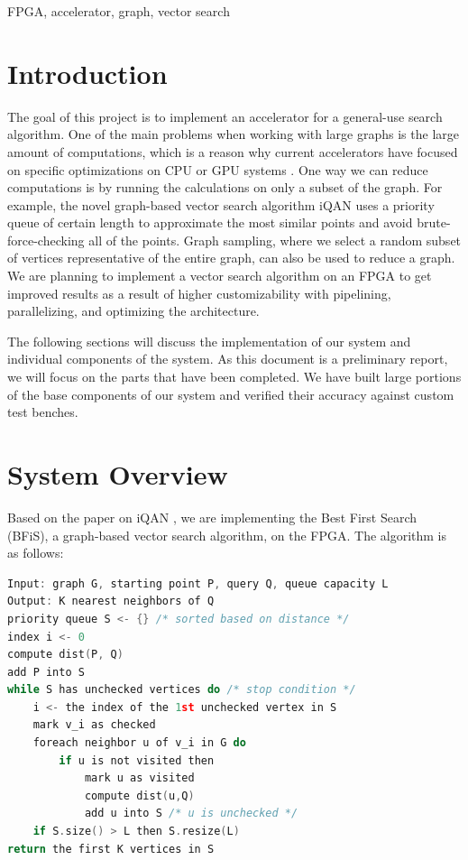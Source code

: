 \documentclass[conference]{IEEEtran}
\begin{document}
\begin{IEEEkeywords}
FPGA, accelerator, graph, vector search
\end{IEEEkeywords}

\section{Introduction}
The goal of this project is to implement an accelerator for a general-use search algorithm. One of the main problems when working with large graphs is the large amount of computations, which is a reason why current accelerators have focused on specific optimizations on CPU or GPU systems \cite{jiang2023co}.  One way we can reduce computations is by running the calculations on only a subset of the graph. For example, the novel graph-based vector search algorithm iQAN \cite{peng2023iqan} uses a priority queue of certain length to approximate the most similar points and avoid brute-force-checking all of the points. Graph sampling, where we select a random subset of vertices representative of the entire graph, can also be used to reduce a graph. We are planning to implement a vector search algorithm on an FPGA to get improved results as a result of higher customizability with pipelining, parallelizing, and optimizing the architecture.

The following sections will discuss the implementation of our system and individual components of the system. As this document is a preliminary report, we will focus on the parts that have been completed. We have built large portions of the base components of our system and verified their accuracy against custom test benches.

\section{System Overview}
Based on the paper on iQAN \cite{peng2023iqan}, we are implementing the Best First Search (BFiS), a graph-based vector search algorithm, on the FPGA. The algorithm is as follows:

\begin{lstlisting}[language=c]
Input: graph G, starting point P, query Q, queue capacity L
Output: K nearest neighbors of Q
priority queue S <- {} /* sorted based on distance */
index i <- 0
compute dist(P, Q)
add P into S
while S has unchecked vertices do /* stop condition */
    i <- the index of the 1st unchecked vertex in S
    mark v_i as checked
    foreach neighbor u of v_i in G do
        if u is not visited then
            mark u as visited
            compute dist(u,Q)
            add u into S /* u is unchecked */
    if S.size() > L then S.resize(L)
return the first K vertices in S
\end{lstlisting}
\end{document}
